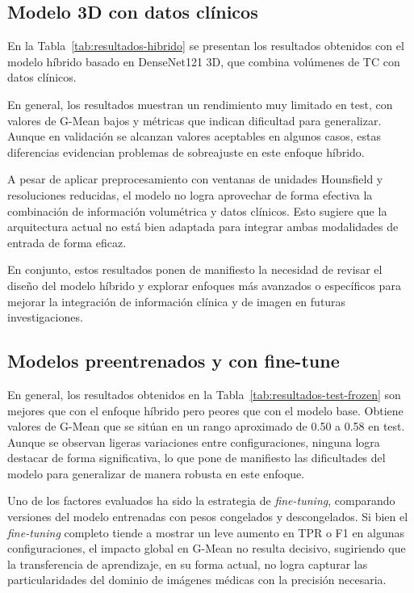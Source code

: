 \subsection{Modelo 3D con datos clínicos}
En la Tabla~\ref{tab:resultados-hibrido} se presentan los resultados obtenidos con el modelo híbrido basado en DenseNet121 3D, que combina volúmenes de TC con datos clínicos. 

En general, los resultados muestran un rendimiento muy limitado en test, con valores de G-Mean bajos y métricas que indican dificultad para generalizar. Aunque en validación se alcanzan valores aceptables en algunos casos, estas diferencias evidencian problemas de sobreajuste en este enfoque híbrido.

A pesar de aplicar preprocesamiento con ventanas de unidades Hounsfield y resoluciones reducidas, el modelo no logra aprovechar de forma efectiva la combinación de información volumétrica y datos clínicos. Esto sugiere que la arquitectura actual no está bien adaptada para integrar ambas modalidades de entrada de forma eficaz.

En conjunto, estos resultados ponen de manifiesto la necesidad de revisar el diseño del modelo híbrido y explorar enfoques más avanzados o específicos para mejorar la integración de información clínica y de imagen en futuras investigaciones.


\subsection{Modelos preentrenados y con fine-tune}

En general, los resultados obtenidos en la Tabla~\ref{tab:resultados-test-frozen} son mejores que con el enfoque híbrido pero peores que con el modelo base. Obtiene valores de G-Mean que se sitúan en un rango aproximado de 0.50 a 0.58 en test. Aunque se observan ligeras variaciones entre configuraciones, ninguna logra destacar de forma significativa, lo que pone de manifiesto las dificultades del modelo para generalizar de manera robusta en este enfoque.

Uno de los factores evaluados ha sido la estrategia de \textit{fine-tuning}, comparando versiones del modelo entrenadas con pesos congelados y descongelados. Si bien el \textit{fine-tuning} completo tiende a mostrar un leve aumento en TPR o F1 en algunas configuraciones, el impacto global en G-Mean no resulta decisivo, sugiriendo que la transferencia de aprendizaje, en su forma actual, no logra capturar las particularidades del dominio de imágenes médicas con la precisión necesaria.

